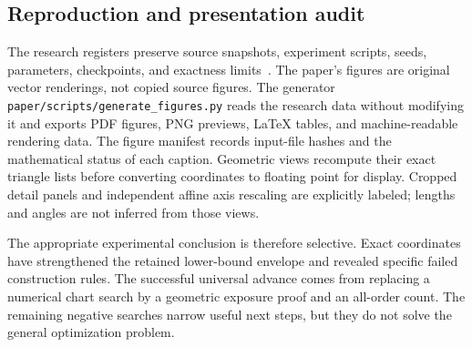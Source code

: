 \subsection{Reproduction and presentation audit}

The research registers preserve source snapshots, experiment scripts, seeds,
parameters, checkpoints, and exactness limits~\cite{zarzueloRepository}. The
paper's figures are original vector renderings, not copied source figures.
The generator \texttt{paper/scripts/generate\_figures.py} reads the research
data without modifying it and exports PDF figures, PNG previews, LaTeX tables,
and machine-readable rendering data. The figure manifest records input-file
hashes and the mathematical status of each caption. Geometric views recompute
their exact triangle lists before converting coordinates to floating point
for display. Cropped detail panels and independent affine axis rescaling are
explicitly labeled; lengths and angles are not inferred from those views.

The appropriate experimental conclusion is therefore selective. Exact
coordinates have strengthened the retained lower-bound envelope and revealed
specific failed construction rules. The successful universal advance comes
from replacing a numerical chart search by a geometric exposure proof and an
all-order count. The remaining negative searches narrow useful next steps,
but they do not solve the general optimization problem.
